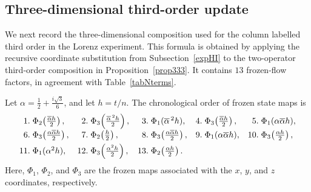 \documentclass[preprint,1p,times,nopreprintline]{elsarticle}
\begin{document}
\subsection{Three-dimensional third-order update}

We next record the three-dimensional composition used for the column labelled third order in the Lorenz experiment. This formula is obtained by applying the recursive coordinate substitution from Subsection~\ref{expHI} to the two-operator third-order composition in Proposition~\ref{prop333}. It contains $13$ frozen-flow factors, in agreement with Table~\ref{tabNterms}.

Let $\alpha=\frac{1}{2}+\frac{i\sqrt{3}}{6}$, and let $h=t/n$. The chronological order of frozen state maps is
\[
\begin{array}{r@{\;}l r@{\;}l r@{\;}l r@{\;}l r@{\;}l}
1.& \Phi_2\!\left(\frac{\overline{\alpha}h}{2}\right),&
2.& \Phi_3\!\left(\frac{\overline{\alpha}^{\,2}h}{2}\right),&
3.& \Phi_1(\overline{\alpha}^{\,2}h),&
4.& \Phi_3\!\left(\frac{\overline{\alpha}h}{2}\right),&
5.& \Phi_1(\alpha\overline{\alpha}h),\\[0.4em]
6.& \Phi_3\!\left(\frac{\alpha\overline{\alpha}h}{2}\right),&
7.& \Phi_2\!\left(\frac{h}{2}\right),&
8.& \Phi_3\!\left(\frac{\alpha\overline{\alpha}h}{2}\right),&
9.& \Phi_1(\alpha\overline{\alpha}h),&
10.& \Phi_3\!\left(\frac{\alpha h}{2}\right),\\[0.4em]
11.& \Phi_1(\alpha^2h),&
12.& \Phi_3\!\left(\frac{\alpha^2h}{2}\right),&
13.& \Phi_2\!\left(\frac{\alpha h}{2}\right).&&&&
\end{array}
\]
Here, $\Phi_1$, $\Phi_2$, and $\Phi_3$ are the frozen maps associated with the $x$, $y$, and $z$ coordinates, respectively.
\end{document}
